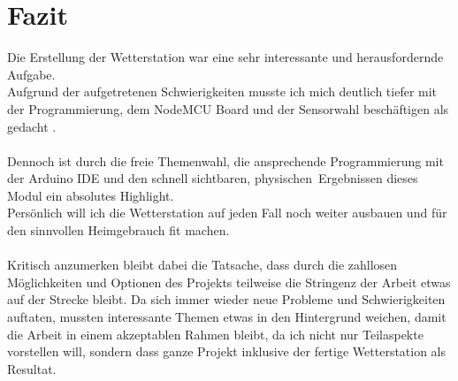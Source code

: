 \documentclass[12pt,a4paper]{scrartcl}	%
\begin{document}
\section{Fazit}
Die Erstellung der Wetterstation war eine sehr interessante und herausfordernde Aufgabe.\\
Aufgrund der aufgetretenen Schwierigkeiten musste ich mich deutlich tiefer mit der Programmierung, dem NodeMCU Board und der Sensorwahl beschäftigen als gedacht .\\
\\
Dennoch ist durch die freie Themenwahl, die ansprechende Programmierung mit der Arduino IDE und den schnell sichtbaren, \glqq physischen\grqq~Ergebnissen dieses Modul ein absolutes Highlight.\\
Persönlich will ich die Wetterstation auf jeden Fall noch weiter ausbauen und für den sinnvollen Heimgebrauch fit machen.\\
\\
Kritisch anzumerken bleibt dabei die Tatsache, dass durch die zahllosen Möglichkeiten und Optionen des Projekts teilweise die Stringenz der Arbeit etwas auf der Strecke bleibt. Da sich immer wieder neue Probleme und Schwierigkeiten auftaten, mussten interessante Themen etwas in den Hintergrund weichen, damit die Arbeit in einem akzeptablen Rahmen bleibt, da ich nicht nur Teilaspekte vorstellen will, sondern dass ganze Projekt inklusive der fertige Wetterstation als Resultat.
\newpage

\printbibliography
\end{document}
